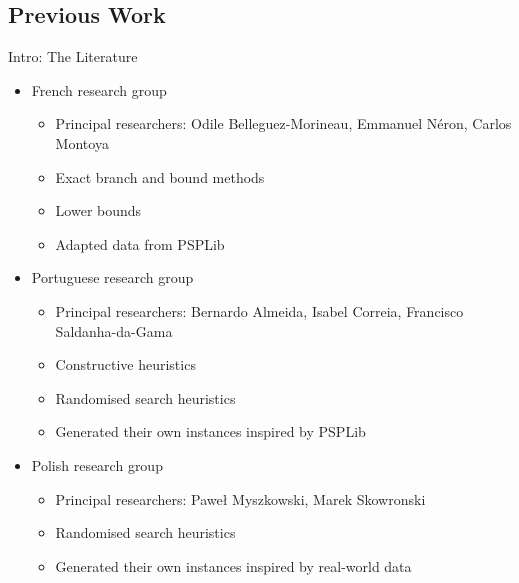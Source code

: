 \documentclass{beamer}
\begin{document}
\subsection{Previous Work}
\begin{frame}{Intro: The Literature}
	\begin{itemize}
		\item French research group
		\begin{itemize}
			\item Principal researchers: Odile Belleguez-Morineau, Emmanuel N\'{e}ron, Carlos Montoya
			\item Exact branch and bound methods
			\item Lower bounds
			\item Adapted data from PSPLib\pause
		\end{itemize}	
		\vspace{2mm}
		\item Portuguese research group
		\begin{itemize}
			\item Principal researchers: Bernardo Almeida, Isabel Correia, Francisco Saldanha-da-Gama
			\item Constructive heuristics
			\item Randomised search heuristics
			\item Generated their own instances inspired by PSPLib\pause
		\end{itemize}
		\vspace{2mm}
		\item Polish research group
		\begin{itemize}
			\item Principal researchers: Pawe\l{} Myszkowski, Marek Skowronski
			\item Randomised search heuristics
			\item Generated their own instances inspired by real-world data
		\end{itemize}
	\end{itemize}
\end{frame}

\end{document}

